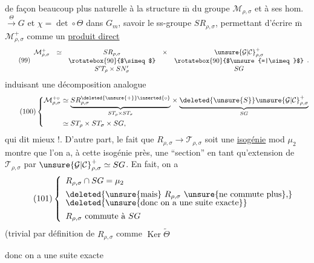 
 de façon beaucoup plus naturelle à la structure
$\overline{\mathrm m}$ du groupe $\mathcal{M}_{\rho,\sigma}$ et à ses hom.
$\xrightarrow{\Theta}G$ et $\chi=\det\circ\Theta$ dans $G_m$, savoir le
ss-groupe  $SR_{\rho,\sigma}$, permettant d'écrire
$\overline{\mathrm m}$ $\mathcal{M}_{\rho,\sigma}^{+}$ comme un
\uline{produit direct}
\[
\tag{99}
\begin{array}{rccccc}
\mathcal{M}_{\rho,\sigma}^{+}&\simeq&SR_{\rho,\sigma}&\times&
 \unsure{\mathcal{G}|\mathcal{C}}_{\rho,\sigma}^{+}\\
&&\rotatebox{90}{$\simeq$}&&\rotatebox{90}{$\unsure{=|\simeq}$}\\
&&S'T_\rho\times SN'_\sigma&&SG
\end{array}
.
\]
induisant une décomposition analogue
\[
\tag{100}
\left\{
\begin{aligned}
\mathcal{M}_{\rho,\sigma}^{+\circ}
 &\simeq \underset{ST_\rho\times ST_\sigma}{\underbrace{
 SR_{\rho,\sigma}^{\deleted{\unsure{+}}\inserted{\circ}}}}
 \times
 \underset{SG}{\underbrace{\deleted{\unsure{S}}\unsure{\mathcal{G}|\mathcal{C}}_{\rho,\sigma}^{+}}}\\
 &\simeq ST_\rho\times ST_\sigma\times SG,
\end{aligned}
\right.
\]
qui dit mieux !. D'autre part, le fait que
$R_{\rho,\sigma}\longrightarrow\mathcal{T}_{\rho,\sigma}$ soit une
\uline{isogénie} mod $\mu_2$ montre que l'on a, à cette isogénie près, une
``section'' 
en tant qu'extension de $\mathcal{T}_{\rho,\sigma}$ par
$\unsure{\mathcal{G}|\mathcal{C}}_{\rho,\sigma}^{+}\simeq SG$.
En fait, on a
\[
\tag{101}
\left\{
\begin{array}{l}
R_{\rho,\sigma}\cap SG=\mu_2\\[4pt]
\deleted{\text{\unsure{mais} }R_{\rho,\sigma}\text{ \unsure{ne commute plus},}}\\[-2pt]
\deleted{\text{\unsure{donc on a une suite exacte}}}\\[4pt]
R_{\rho,\sigma}\text{ commute à }SG
\end{array}
\right.
\]
\hfill (trivial par définition de $R_{\rho,\sigma}$ comme
$\operatorname{Ker}\widetilde{\Theta}$

donc on a une suite exacte


